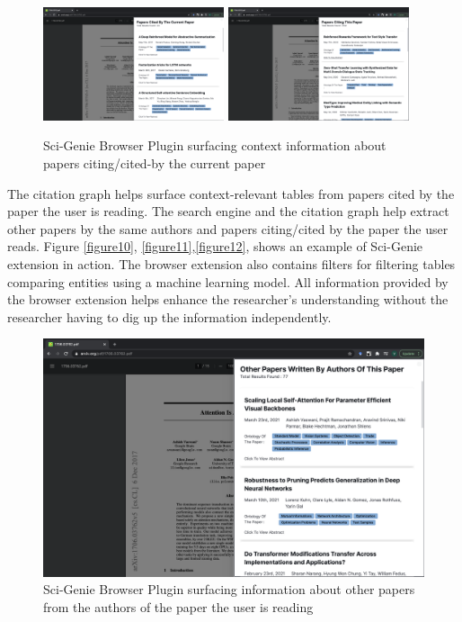 \begin{figure}[h]
    \includegraphics[width=0.475\textwidth]{src/images/sci-genie-ext-cite-out-exp.png}
    \hfill
    \includegraphics[width=0.475\textwidth]{src/images/sci-genie-ext-cite-exp.png}
    \caption{ Sci-Genie Browser Plugin surfacing context information about papers citing/cited-by the current paper }
    \label{figure\arabic{figurecounter}}
\end{figure}

The citation graph helps surface context-relevant tables from papers cited by the paper the user is reading.  The search engine and the citation graph help extract other papers by the same authors and papers citing/cited by the paper the user reads. Figure \ref{figure10}, \ref{figure11},\ref{figure12}, shows an example of Sci-Genie extension in action. The browser extension also contains filters for filtering tables comparing entities using a machine learning model. All information provided by the browser extension helps enhance the researcher’s understanding without the researcher having to dig up the information independently. 

\begin{figure}[h]
    \centering
    \includegraphics[width=\maxwidth{\textwidth}]{src/images/sci-genie-ext-authors-exp.png}
    \caption{ Sci-Genie Browser Plugin surfacing information about other papers from the authors of the paper the user is reading}
    \label{figure\arabic{figurecounter}}
\end{figure}

